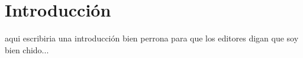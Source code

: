 \section{Introducción}

aqui escribiria una introducción bien perrona para que los editores digan que soy bien chido...